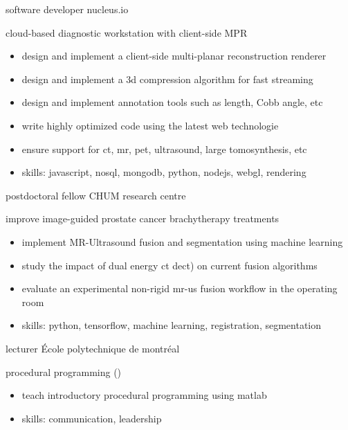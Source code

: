 \documentclass[print]{friggeri-cv}
\begin{document}
\begin{entrylist}
  {software developer} {nucleus.io}
  {cloud-based diagnostic workstation with client-side {\small MPR}
  \begin{itemize}
    \item design and implement a client-side multi-planar reconstruction renderer
    \item design and implement a 3d compression algorithm for fast streaming
    \item design and implement annotation tools such as length, Cobb angle, etc 
    \item write highly optimized code using the latest web technologie
    \item ensure support for ct, mr, pet, ultrasound, large tomosynthesis, etc
    \item skills: javascript, nosql, mongodb, python, nodejs, webgl, rendering
  \end{itemize}}

  {postdoctoral fellow}
  {CHUM research centre}
  {improve image-guided prostate cancer brachytherapy treatments
  \begin{itemize}
    \item implement MR-Ultrasound fusion and segmentation using machine learning
    \item study the impact of dual energy ct dect) on current fusion algorithms
    \item evaluate an experimental non-rigid mr-us fusion workflow in the operating room
    \item skills: python, tensorflow, machine learning, registration, segmentation
  \end{itemize}}


  {lecturer}
  {École polytechnique de montréal} 
  {procedural programming (\infmat)
  \begin{itemize}
    \item teach introductory procedural programming using matlab
    \item skills: communication, leadership
  \end{itemize}}

\end{entrylist}

\clearpage
\end{document}
